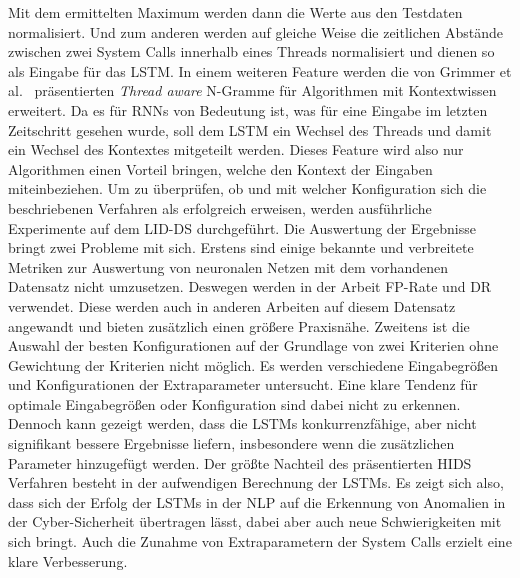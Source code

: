 Mit dem ermittelten Maximum werden dann die Werte aus den Testdaten normalisiert.
Und zum anderen werden auf gleiche Weise die zeitlichen Abstände zwischen zwei System Calls innerhalb eines Threads normalisiert und dienen so als Eingabe für das \ac{LSTM}.
In einem weiteren Feature werden die von Grimmer et al.~\cite{IDSTHREADGRIMMER2021} präsentierten \textit{Thread aware} N-Gramme für Algorithmen mit Kontextwissen erweitert.
Da es für \acp{RNN} von Bedeutung ist, was für eine Eingabe im letzten Zeitschritt gesehen wurde, soll dem \ac{LSTM} ein Wechsel des Threads und damit ein Wechsel des Kontextes mitgeteilt werden.
Dieses Feature wird also nur Algorithmen einen Vorteil bringen, welche den Kontext der Eingaben miteinbeziehen.
Um zu überprüfen, ob und mit welcher Konfiguration sich die beschriebenen Verfahren als erfolgreich erweisen, werden ausführliche Experimente auf dem \ac{LID-DS} durchgeführt.
Die Auswertung der Ergebnisse bringt zwei Probleme mit sich.
Erstens sind einige bekannte und verbreitete Metriken zur Auswertung von neuronalen Netzen mit dem vorhandenen Datensatz nicht umzusetzen.
Deswegen werden in der Arbeit \ac{FP}-Rate und \ac{DR} verwendet. 
Diese werden auch in anderen Arbeiten auf diesem Datensatz angewandt und bieten zusätzlich einen größere Praxisnähe.
Zweitens ist die Auswahl der besten Konfigurationen auf der Grundlage von zwei Kriterien ohne Gewichtung der Kriterien nicht möglich.
Es werden verschiedene Eingabegrößen und Konfigurationen der Extraparameter untersucht.
Eine klare Tendenz für optimale Eingabegrößen oder Konfiguration sind dabei nicht zu erkennen.
Dennoch kann gezeigt werden, dass die \acp{LSTM} konkurrenzfähige, aber nicht signifikant bessere Ergebnisse liefern, insbesondere wenn die zusätzlichen Parameter hinzugefügt werden.
Der größte Nachteil des präsentierten \ac{HIDS} Verfahren besteht in der aufwendigen Berechnung der \acp{LSTM}.
Es zeigt sich also, dass sich der Erfolg der \acp{LSTM} in der \ac{NLP} auf die Erkennung von Anomalien in der Cyber-Sicherheit übertragen lässt, dabei aber auch neue Schwierigkeiten mit sich bringt.
Auch die Zunahme von Extraparametern der System Calls erzielt eine klare Verbesserung.

